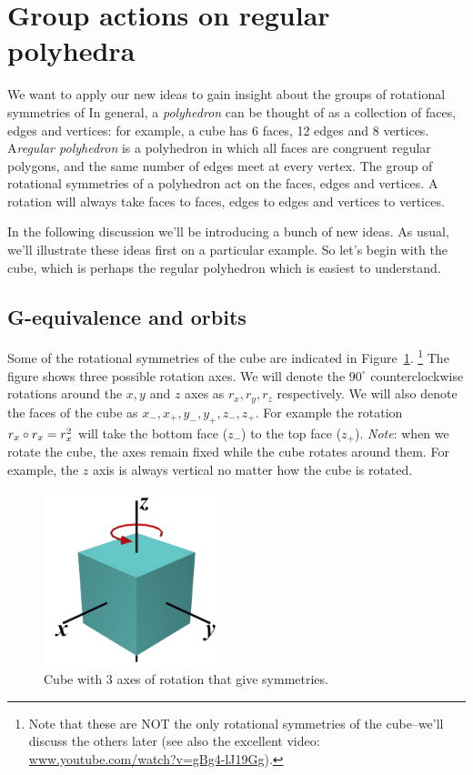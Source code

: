 \section{Group actions on regular polyhedra}\label{ActionsOnPolyhedra}
We want to apply our new ideas to gain insight about the groups of rotational symmetries of   In general, a \emph{polyhedron} can be thought of as a collection of faces, edges and vertices: for example, a cube has 6 faces, 12 edges and 8 vertices. A\emph{regular polyhedron} is a polyhedron in which all faces are congruent regular polygons, and the same number of edges meet at every vertex. The group of rotational symmetries of a polyhedron act on the faces, edges and vertices.  A rotation will always take faces to faces, edges to edges and vertices to vertices. 

In the following discussion we'll be introducing a bunch of new ideas. As usual, we'll illustrate these ideas first on a particular example. So let's begin with the cube, which is perhaps the regular polyhedron which is easiest to understand.

\subsection{G-equivalence and orbits}
Some of the rotational symmetries of the cube are indicated in Figure~\ref{fig:CubeRot}.
\footnote{Note that these are NOT the only rotational symmetries of the cube--we'll discuss the others later (see also the excellent video: \url{www.youtube.com/watch?v=gBg4-lJ19Gg}).}
The figure shows three possible rotation axes. We will denote the $90^{\circ}$ counterclockwise rotations around the $x,y$ and $z$ axes as $r_x, r_y,r_z$ respectively.  We will also denote the faces of the cube as $x_-, x_+,y_-,y_+,z_-,z_+$.  For example the rotation $r_x\circ r_x=r_x^2$ will take the bottom face ($z_-$) to the top face ($z_+$). \emph{Note}:  when we rotate the cube, the axes remain fixed while the cube rotates around them.  For example, the $z$ axis is always vertical no matter how the cube is rotated.

\begin{figure}[ht]
\begin{center}
\includegraphics[width=2in]{images/AxesOfCube.png}
\caption{Cube with 3 axes of rotation that give symmetries.}\label{fig:CubeRot}
\end{center}
\end{figure}


